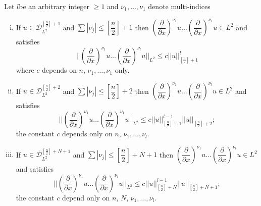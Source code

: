 \begin{proposition}\label{chap5-sec1-prop4}%
Let $l$\pageoriginale be an arbitrary integer $\geq 1$ and $\nu_1,
\ldots, \nu_1$ denote multi-indices  
\begin{enumerate}[(i)]
\item If $u \in \mathscr{D}^{[\frac{n}{2}]+1}_{L^2}$ and
  $\sum |\nu_j|\leq \left[\dfrac{n}{2}\right] + 1$ then
  $\left(\dfrac{\partial}{\partial x}\right)^{\nu_1}u \ldots
  \left(\dfrac{\partial}{\partial x}\right)^{\nu_1}u \in L^2$ and
  satisfies 
\begin{equation*}
|| \left(\frac{\partial}{\partial x}\right)^{\nu_1}u \ldots
\left(\frac{\partial}{\partial x}\right)^{\nu_l}u ||_{L^2} \leq c || u
||^l_{[\frac{n}{2}]+1} \tag{1.14}\label{chap5-eq1.14} 
\end{equation*}
where $c$ depends on $n$, $\nu_1, \ldots, \nu_1$ only.

\item If $u \in \mathscr{D}^{[\frac{n}{2}]+2}_{L^2}$ and
  $\sum | \nu_j | \leq \left[\dfrac{n}{2} \right] + 2$ then
  $\left(\dfrac{\partial}{\partial x}\right)^{\nu_1}u \ldots
  \left(\dfrac{\partial}{\partial x}\right)^{\nu_l} u \in L^2$ and
  satisfies 
\begin{equation}
|| \left(\frac{\partial}{\partial x}\right)^{\nu_1}u \ldots
\left(\frac{\partial}{\partial x}\right)^{\nu_1}u ||_{L^2} \leq c || u
||^{l-1}_{\left[\frac{n}{2} \right]+1} || u
||_{\left[\frac{n}{2}\right]+2} ;\tag{1.15}\label{chap5-eq1.15}  
\end{equation}
the constant $c$ depends only on $n$, $\nu_1, \ldots, \nu_l$. 

\item If $u \in \mathscr{D}^{\left[\frac{n}{2}
    \right]+N+1}_{L^2}$ and 
  $\sum | \nu_j | \leq \left[\dfrac{n}{2} \right]+N+1$ then
  $\left(\dfrac{\partial}{\partial x}\right)^{\nu_1}u \ldots
  \left(\dfrac{\partial}{\partial x}\right)^{\nu_l}u \in L^2$ and
  satisfies 
\begin{equation}
|| \left(\frac{\partial}{\partial x}\right)^{\nu_1}u \ldots
\left(\frac{\partial}{\partial x}\right)^{\nu_l}u ||_{L^2} \leq c || u
||^{l-1}_{\left[\frac{n}{2} \right]+N} || u ||_{\left[ \frac{n}{2}
      \right]+N+1}; \tag{1.16}\label{chap5-eq1.16}  
\end{equation}
the constant $c$ depend only on $n$, $N$, $\nu_1, \ldots, \nu_l$.
\end{enumerate}
\end{proposition}

